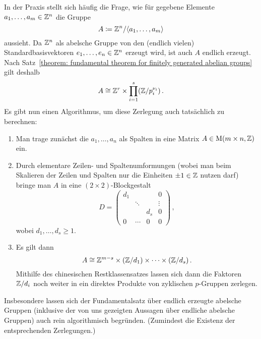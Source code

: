 \begin{remark}
  In der Praxis stellt sich häufig die Frage, wie für gegebene Elemente $a_1, \dotsc, a_m \in \mathbb{Z}^n$ die Gruppe
  \[
              A
    \coloneqq \mathbb{Z}^n / \langle a_1, \dotsc, a_m\rangle
  \]
  aussieht.
  Da $\mathbb{Z}^n$ als abelsche Gruppe von den (endlich vielen) Standardbasisvektoren $e_1, \dotsc, e_n \in \mathbb{Z}^n$ erzeugt wird, ist auch $A$ endlich erzeugt.
  Nach Satz~\ref{theorem: fundamental theorem for finitely generated abelian groups} gilt deshalb
  \[
          A
    \cong \mathbb{Z}^r \times \prod_{i=1}^s (\mathbb{Z}/p_i^{\nu_i}) \,.
  \]
  Es gibt nun einen Algorithmus, um diese Zerlegung auch tatsächlich zu berechnen:
  \begin{enumerate}
    \item
      Man trage zunächst die $a_1, \dotsc, a_n$ als Spalten in eine Matrix $A \in \operatorname{M}(m \times n, \mathbb{Z})$ ein.
    \item
      Durch elementare Zeilen- und Spaltenumformungen (wobei man beim Skalieren der Zeilen und Spalten nur die Einheiten $\pm 1 \in \mathbb{Z}$ nutzen darf) bringe man $A$ in eine $(2 \times 2)$-Blockgestalt
      \[
          D
        = \left(
          \begin{array}{ccc|c}
            d_1 &         &         & 0       \\
                & \ddots  &         & \vdots  \\
                &         & d_s     & 0       \\
            \hline
            0   & \cdots  & 0       & 0
          \end{array}
          \right) \,,
      \]
      wobei $d_1, \dotsc, d_s \geq 1$.
    \item
      Es gilt dann
      \[
              A
        \cong \mathbb{Z}^{m-s} \times (\mathbb{Z}/d_1) \times \dotsb \times (\mathbb{Z}/d_s) \,.
      \]
      Mithilfe des chinesischen Restklassensatzes lassen sich dann die Faktoren $\mathbb{Z}/d_i$ noch weiter in ein direktes Produkte von zyklischen $p$-Gruppen zerlegen.
  \end{enumerate}
  Insbesondere lassen sich der Fundamentalsatz über endlich erzeugte abelsche Gruppen (inklusive der von uns gezeigten Aussagen über endliche abelsche Gruppen) auch rein algorithmisch begründen.
  (Zumindest die Existenz der entsprechenden Zerlegungen.)
\end{remark}



